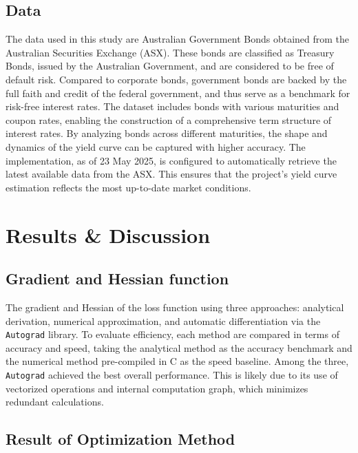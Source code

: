 \documentclass[12pt]{article}
\begin{document}
\subsection{Data}

The data used in this study are Australian Government Bonds obtained from the Australian Securities Exchange (ASX). These bonds are classified as Treasury Bonds, issued by the Australian Government, and are considered to be free of default risk. Compared to corporate bonds, government bonds are backed by the full faith and credit of the federal government, and thus serve as a benchmark for risk-free interest rates. The dataset includes bonds with various maturities and coupon rates, enabling the construction of a comprehensive term structure of interest rates. By analyzing bonds across different maturities, the shape and dynamics of the yield curve can be captured with higher accuracy. The implementation, as of 23 May 2025, is configured to automatically retrieve the latest available data from the ASX. This ensures that the project's yield curve estimation reflects the most up-to-date market conditions.

\section{Results \& Discussion}\label{sec:results}

\subsection{Gradient and Hessian function}

The gradient and Hessian of the loss function using three approaches: analytical derivation, numerical approximation, and automatic differentiation via the \texttt{Autograd} library. To evaluate efficiency, each method are compared in terms of accuracy and speed, taking the analytical method as the accuracy benchmark and the numerical method pre-compiled in C as the speed baseline. Among the three, \texttt{Autograd} achieved the best overall performance. This is likely due to its use of vectorized operations and internal computation graph, which minimizes redundant calculations. 

\subsection{Result of Optimization Method }
\end{document}
